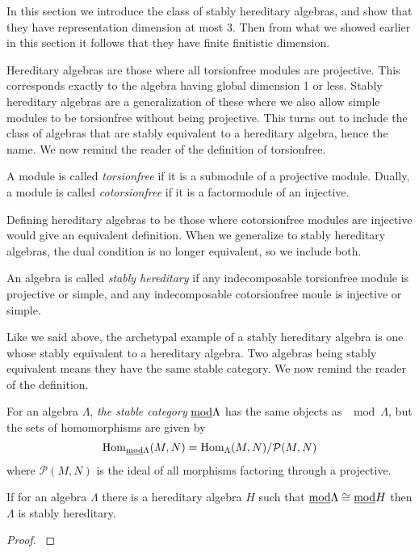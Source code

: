 In this section we introduce the class of stably hereditary algebras, and show that they have representation dimension at most 3. Then from what we showed earlier in this section it follows that they have finite finitistic dimension.

Hereditary algebras are those where all torsionfree modules are projective. This corresponds exactly to the algebra having global dimension 1 or less. Stably hereditary algebras are a generalization of these where we also allow simple modules to be torsionfree without being projective. This turns out to include the class of algebras that are stably equivalent to a hereditary algebra, hence the name. We now remind the reader of the definition of torsionfree. 

\begin{defn}[(co)torsionfree]
	A module is called \emph{torsionfree} if it is a submodule of a projective module. Dually, a module is called \emph{cotorsionfree} if it is a factormodule of an injective.
\end{defn}

Defining hereditary algebras to be those where cotorsionfree modules are injective would give an equivalent definition. When we generalize to stably hereditary algebras, the dual condition is no longer equivalent, so we include both.

\begin{defn}
	An algebra is called \emph{stably hereditary} if any indecomposable torsionfree module is projective or simple, and any indecomposable cotorsionfree moule is injective or simple. 
\end{defn}

Like we said above, the archetypal example of a stably hereditary algebra is one whose stably equivalent to a hereditary algebra. Two algebras being stably equivalent means they have the same stable category. We now remind the reader of the definition.

\begin{defn}
	For an algebra $\Lambda$, \emph{the stable category} $\underline{\mod}\Lambda$ has the same objects as $\mod\Lambda$, but the sets of homomorphisms are given by $$\Hom_{\underline{\mod}\Lambda}(M, N) = \Hom_\Lambda(M,N)/\mathcal{P}(M,N)$$
	where $\mathcal{P}(M,N)$ is the ideal of all morphisms factoring through a projective.
\end{defn}

\begin{prop}
	If for an algebra $\Lambda$ there is a hereditary algebra $H$ such that $\underline{\mod}\Lambda \cong \underline{\mod}H$ then $\Lambda$ is stably hereditary.
	\begin{proof}
		 \cite[Chapter~IV, Theorem~1.5]{AR73}
	\end{proof}
\end{prop}

